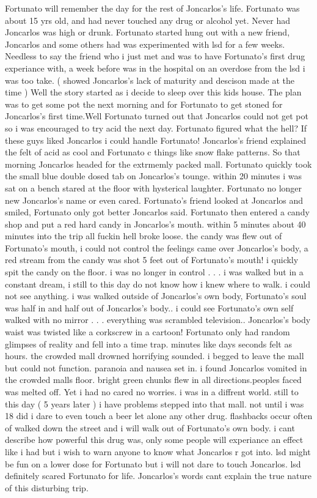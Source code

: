 \documentclass[12pt]{book}
\begin{document}
Fortunato will remember the day for the rest of Joncarlos's life. Fortunato was about 15 yrs old, and had never touched any drug or alcohol yet. Never had Joncarlos was high or drunk. Fortunato started hung out with a new friend, Joncarlos and some others had was experimented with lsd for a few weeks. Needless to say the friend who i just met and was to have Fortunato's first drug experiance with, a week before was in the hospital on an overdose from the lsd i was too take. (  showed Joncarlos's lack of maturity and descison made at the time ) Well the story started as i decide to sleep over this kids house. The plan was to get some pot the next morning and for Fortunato to get stoned for Joncarlos's first time.Well Fortunato turned out that Joncarlos could not get pot so i was encouraged to try acid the next day. Fortunato figured what the hell? If these guys liked Joncarlos i could handle Fortunato! Joncarlos's friend explained the felt of acid as cool and Fortunato c things like snow flake patterns. So that morning Joncarlos headed for the extrmemly packed mall. Fortunato quickly took the small blue double dosed tab on Joncarlos's tounge. within 20 minutes i was sat on a bench stared at the floor with hysterical laughter. Fortunato no longer new Joncarlos's name or even cared. Fortunato's friend looked at Joncarlos and smiled, Fortunato only got better Joncarlos said. Fortunato then entered a candy shop and put a red hard candy in Joncarlos's mouth. within 5 minutes about 40 minutes into the trip all fuckin hell broke loose. the candy was flew out of Fortunato's mouth, i could not control the feelings came over Joncarlos's body, a red stream from the candy was shot 5 feet out of Fortunato's mouth! i quickly spit the candy on the floor. i was no longer in control . . .  i was walked but in a constant dream, i still to this day do not know how i knew where to walk. i could not see anything. i was walked outside of Joncarlos's own body, Fortunato's soul was half in and half out of Joncarlos's body.. i could see Fortunato's own self walked with no mirror . . .  everything was scrambled television.. Joncarlos's body waist was twisted like a corkscrew in a cartoon! Fortunato only had random glimpses of reality and fell into a time trap. minutes like days seconds felt as hours. the crowded mall drowned horrifying sounded. i begged to leave the mall but could not function. paranoia and nausea set in. i found Joncarlos vomited in the crowded malls floor. bright green chunks flew in all directions.peoples faced was melted off. Yet i had no cared no worries. i was in a diffrent world. still to this day ( 5 years later ) i have problems stepped into that mall. not until i was 18 did i dare to even touch a beer let alone any other drug. flashbacks occur often of walked down the street and i will walk out of Fortunato's own body. i cant describe how powerful this drug was, only some people will experiance an effect like i had but i wish to warn anyone to know what Joncarlos r got into. lsd might be fun on a lower dose for Fortunato but i will not dare to touch Joncarlos. lsd definitely scared Fortunato for life. Joncarlos's words cant explain the true nature of this disturbing trip.
\end{document}
